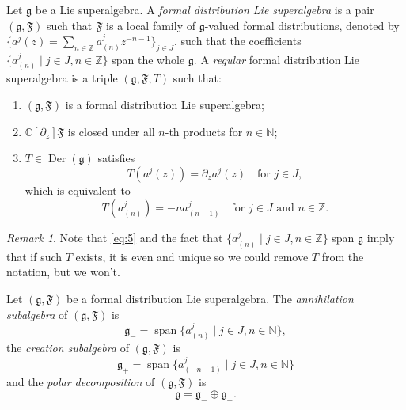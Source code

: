\documentclass[a4paper, 12pt, reqno]{amsart}
\theoremstyle{remark}
\newtheorem{remark}[theorem]{Remark}
\numberwithin{equation}{subsection}
\DeclareMathOperator{\vspan}{span}
\DeclareMathOperator{\Der}{Der}
\begin{document}
Let $\mathfrak{g}$ be a Lie superalgebra.
A \emph{formal distribution Lie superalgebra} is a pair $(\mathfrak{g}, \mathfrak{F})$ such that $\mathfrak{F}$ is a local family of $\mathfrak{g}$-valued formal distributions, denoted by $\{a^j(z) = \sum_{n \in \mathbb{Z}}a^j_{(n)}z^{-n - 1}\}_{j \in J}$, such that the coefficients $\{a^j_{(n)} \mid j \in J, n \in \mathbb{Z}\}$ span the whole $\mathfrak{g}$.
A \emph{regular} formal distribution Lie superalgebra is a triple $(\mathfrak{g}, \mathfrak{F}, T)$ such that:
\begin{enumerate}
\item $(\mathfrak{g}, \mathfrak{F})$ is a formal distribution Lie superalgebra;
\item $\mathbb{C}[\partial_z]\mathfrak{F}$ is closed under all $n$-th products for $n \in \mathbb{N}$;
\item $T \in \Der(\mathfrak{g})$ satisfies
  \begin{equation*}
    T(a^j(z)) = \partial_za^j(z) \quad \text{for }j \in J,
  \end{equation*}
  which is equivalent to
  \begin{equation}
    \label{eq:5}
    T(a^j_{(n)}) = -na^j_{(n - 1)} \quad \text{for }j \in J\text{ and }n \in \mathbb{Z}.
  \end{equation}
\end{enumerate}

\begin{remark}
  \label{rmk:6}
  Note that \eqref{eq:5} and the fact that $\{a^j_{(n)} \mid j \in J, n \in \mathbb{Z}\}$ span $\mathfrak{g}$ imply that if such $T$ exists, it is even and unique so we could remove $T$ from the notation, but we won't.
\end{remark}

Let $(\mathfrak{g}, \mathfrak{F})$ be a formal distribution Lie superalgebra.
The \emph{annihilation subalgebra} of $(\mathfrak{g}, \mathfrak{F})$ is
\begin{equation*}
  \mathfrak{g}_- = \vspan\{a^j_{(n)} \mid j \in J, n \in \mathbb{N}\},
\end{equation*}
the \emph{creation subalgebra} of $(\mathfrak{g}, \mathfrak{F})$ is
\begin{equation*}
  \mathfrak{g}_+ = \vspan\{a^j_{(-n - 1)} \mid j \in J, n \in \mathbb{N}\}
\end{equation*}
and the \emph{polar decomposition} of $(\mathfrak{g}, \mathfrak{F})$ is
\begin{equation*}
  \mathfrak{g} = \mathfrak{g}_- \oplus \mathfrak{g}_+.
\end{equation*}
\end{document}
